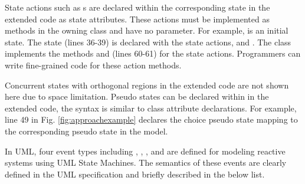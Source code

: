 State actions such as s are declared within the corresponding state in the extended code as state attributes.
These actions must be implemented as methods in the owning class and have no parameter.
For example,  is an initial state. 
The  state (lines 36-39) is declared with the state actions,  and . 
The  class implements the methods  and  (lines 60-61) for the state actions.
Programmers can write fine-grained code for these action methods.


Concurrent states with orthogonal regions in the extended code are not shown here due to space limitation. 
Pseudo states can be declared within  in the extended code, the syntax is similar to class attribute declarations.
For example, line 49 in Fig. \ref{fig:approachexample} declares the  choice pseudo state mapping to the corresponding pseudo state in the  model.   

\noindent
{}
In UML, four event types including , , , and  are defined for modeling reactive systems using UML State Machines. 
The semantics of these events are clearly defined in the UML specification and briefly described in the below list.

